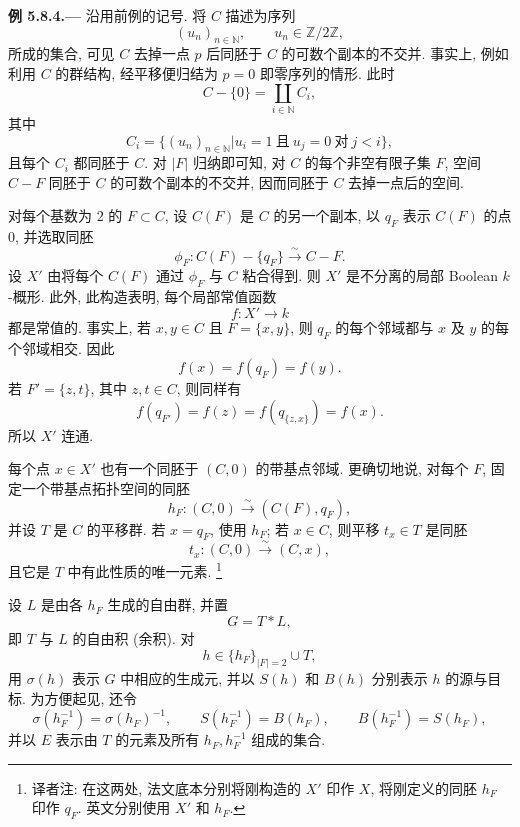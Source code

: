 
\medskip
{}\label{ex:sga3-VIB-5.8.4}%
\noindent\textbf{例 5.8.4.---}
沿用前例的记号. 将 \(C\) 描述为序列
\[
  (u_n)_{n\in\mathbb N},
  \qquad u_n\in\mathbb Z/2\mathbb Z,
\]
所成的集合, 可见 \(C\) 去掉一点 \(p\) 后同胚于
\(C\) 的可数个副本的不交并.
事实上, 例如利用 \(C\) 的群结构, 经平移便归结为
\(p=0\) 即零序列的情形. 此时
\[
  C-\{0\}=\coprod_{i\in\mathbb N}C_i,
\]
其中
\[
  C_i=
  \bigl\{(u_n)_{n\in\mathbb N}\mathrel{\big|}
    u_i=1\ \text{且}\ u_j=0\ \text{对}\ j<i\bigr\},
\]
且每个 \(C_i\) 都同胚于 \(C\).
对 \(\lvert F\rvert\) 归纳即可知, 对 \(C\) 的每个非空有限子集
\(F\), 空间 \(C-F\) 同胚于 \(C\) 的可数个副本的不交并,
因而同胚于 \(C\) 去掉一点后的空间.

对每个基数为 \(2\) 的 \(F\subset C\),
设 \(C(F)\) 是 \(C\) 的另一个副本,
以 \(q_F\) 表示 \(C(F)\) 的点 \(0\), 并选取同胚
\[
  \phi_F:C(F)-\{q_F\}\xrightarrow{\sim}C-F.
\]
设 \(X'\) 由将每个 \(C(F)\) 通过 \(\phi_F\) 与 \(C\) 粘合得到.
则 \(X'\) 是不分离的局部 Boolean \(k\)-概形.
此外, 此构造表明, 每个局部常值函数
\[
  f:X'\longrightarrow k
\]
都是常值的. 事实上, 若 \(x,y\in C\) 且 \(F=\{x,y\}\),
则 \(q_F\) 的每个邻域都与 \(x\) 及 \(y\) 的每个邻域相交. 因此
\[
  f(x)=f(q_F)=f(y).
\]
若 \(F'=\{z,t\}\), 其中 \(z,t\in C\), 则同样有
\[
  f(q_{F'})=f(z)=f(q_{\{z,x\}})=f(x).
\]
所以 \(X'\) 连通.

每个点 \(x\in X'\) 也有一个同胚于 \((C,0)\) 的带基点邻域.
更确切地说, 对每个 \(F\), 固定一个带基点拓扑空间的同胚
\[
  h_F:(C,0)\xrightarrow{\sim}(C(F),q_F),
\]
并设 \(T\) 是 \(C\) 的平移群.
若 \(x=q_F\), 使用 \(h_F\); 若 \(x\in C\),
则平移 \(t_x\in T\) 是同胚
\[
  t_x:(C,0)\xrightarrow{\sim}(C,x),
\]
且它是 \(T\) 中有此性质的唯一元素.%
\footnote[1]{\label{note:sga3-VIB-5.8.4-Xprime-hF}译者注:
在这两处, 法文底本分别将刚构造的 \(X'\) 印作 \(X\),
将刚定义的同胚 \(h_F\) 印作 \(q_F\).
英文分别使用 \(X'\) 和 \(h_F\).}

设 \(L\) 是由各 \(h_F\) 生成的自由群, 并置
\[
  G=T*L,
\]
即 \(T\) 与 \(L\) 的自由积 (余积). 对
\[
  h\in\{h_F\}_{\lvert F\rvert=2}\cup T,
\]
用 \(\sigma(h)\) 表示 \(G\) 中相应的生成元,
并以 \(S(h)\) 和 \(B(h)\) 分别表示 \(h\) 的源与目标.
为方便起见, 还令
\[
  \sigma(h_F^{-1})=\sigma(h_F)^{-1},\qquad
  S(h_F^{-1})=B(h_F),\qquad
  B(h_F^{-1})=S(h_F),
\]
并以 \(E\) 表示由 \(T\) 的元素及所有 \(h_F,h_F^{-1}\) 组成的集合.

